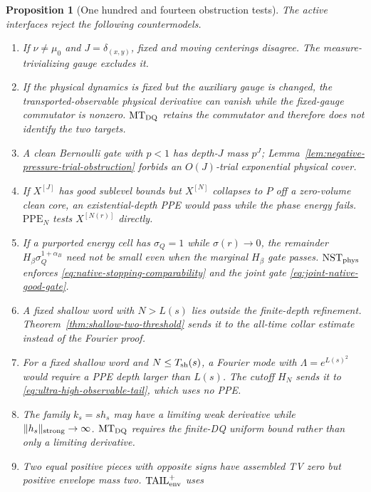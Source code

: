\documentclass[11pt]{article}
\newtheorem{proposition}[theorem]{Proposition}
\begin{document}
\begin{proposition}[One hundred and fourteen obstruction tests]
\label{prop:v48-obstruction-tests}
The active interfaces reject the following countermodels.
\begin{enumerate}[label=\textup{(T\arabic*)}]
\item If $\nu\ne\mu_0$ and $J=\delta_{(x,y)}$, fixed and moving
      centerings disagree.  The measure-trivializing gauge excludes it.
\item If the physical dynamics is fixed but the auxiliary gauge is changed,
      the transported-observable physical derivative can vanish while the
      fixed-gauge commutator is nonzero.  $\mathrm{MT}_{\rm DQ}$ retains the
      commutator and therefore does not identify the two targets.
\item A clean Bernoulli gate with $p<1$ has depth-$J$ mass $p^J$;
      Lemma~\ref{lem:negative-pressure-trial-obstruction} forbids an
      $O(J)$-trial exponential physical cover.
\item If $X^{[J]}$ has good sublevel bounds but $X^{[N]}$ collapses to $P$
      off a zero-volume clean core, an existential-depth PPE would pass while
      the phase energy fails.  $\mathrm{PPE}_{N}$ tests $X^{[N(r)]}$
      directly.
\item If a purported energy cell has $\sigma_Q=1$ while
      $\sigma(r)\to0$, the remainder
      $H_\beta\sigma_Q^{1+\alpha_B}$ need not be small even when the
      marginal $H_\beta$ gate passes.  $\mathrm{NST}_{\rm phys}$ enforces
      \eqref{eq:native-stopping-comparability} and the joint gate
      \eqref{eq:joint-native-good-gate}.
\item A fixed shallow word with $N>L(s)$ lies outside the finite-depth
      refinement.  Theorem~\ref{thm:shallow-two-threshold} sends it to the
      all-time collar estimate instead of the Fourier proof.
\item For a fixed shallow word and $N\le T_{\rm sh}(s)$, a Fourier mode with
      $\Lambda=e^{L(s)^2}$ would require a PPE depth larger than $L(s)$.
      The cutoff $H_N$ sends it to
      \eqref{eq:ultra-high-observable-tail}, which uses no PPE.
\item The family $k_s=s h_s$ may have a limiting weak derivative while
      $\|h_s\|_{\rm strong}\to\infty$.  $\mathrm{MT}_{\rm DQ}$
      requires the finite-DQ uniform bound rather than only a limiting
      derivative.
\item Two equal positive pieces with opposite signs have assembled TV zero
      but positive envelope mass two.  $\mathrm{TAIL}_{\rm env}^{+}$ uses

\end{enumerate}
\end{proposition}
\end{document}
